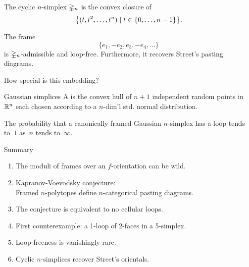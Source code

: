 \begin{frame}{The cyclic $n$-simplex}
	\pause
	$\gsimplex_n$ is the convex closure of
	\[
	\set[\big]{(t,t^2,\dots,t^n) \mid t \in \{0,\dots,n-1\}}.
	\]

	\begin{minipage}{.35\textwidth}
		\par
		\begin{center}
		\end{center}
	\end{minipage}
	\begin{minipage}{.6\textwidth}
		\pause
		The frame
		\[
		\{e_1,-e_2,e_3,-e_4,\dots\}
		\]
		is $\gsimplex_n$-admissible and loop-free.
		Furthermore, it recovers Street's pasting diagrams.

		\pause\vspace*{1cm}
		How special is this embedding?
	\end{minipage}
\end{frame}

\begin{frame}{Gaussian simplices}
	\pause
	A  is the convex hull of $n+1$ independent random points in~$\R^n$ each chosen according to a $n$-dim'l std. normal distribution.

	\pause\bigskip
	 The probability that a canonically framed Gaussian $n$-simplex has a loop tends to~$1$ as~$n$ tends to~$\infty$.
\end{frame}

\begin{frame}{Summary}
	\begin{enumerate}
		\item\pause The moduli of frames over an $f$-orientation can be wild.
		\item\pause Kapranov-Voevodsky conjecture:\\
		\smallskip
		Framed $n$-polytopes define $n$-categorical pasting diagrams.

		\item\pause The conjecture is equivalent to no cellular loops.

		\item\pause First counterexample: a 1-loop of 2-faces in a 5-simplex.

		\item\pause Loop-freeness is vanishingly rare.

		\item\pause Cyclic $n$-simplices recover Street's orientals.
	\end{enumerate}
\end{frame}

